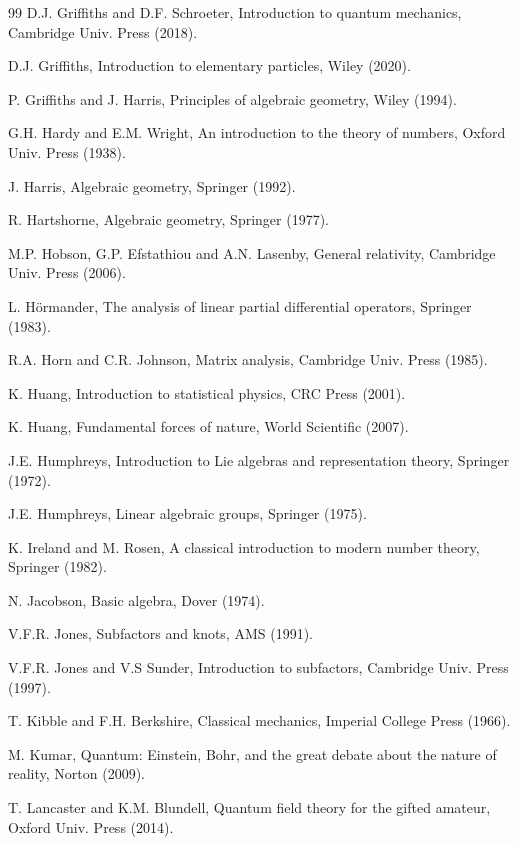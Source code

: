 \documentclass[12pt]{amsbook}
\begin{document}
\begin{thebibliography}{99}
D.J. Griffiths and D.F. Schroeter, Introduction to quantum mechanics, Cambridge Univ. Press (2018).

D.J. Griffiths, Introduction to elementary particles, Wiley (2020).

P. Griffiths and J. Harris, Principles of algebraic geometry, Wiley (1994).

G.H. Hardy and E.M. Wright, An introduction to the theory of numbers, Oxford Univ. Press (1938).

J. Harris, Algebraic geometry, Springer (1992).

R. Hartshorne, Algebraic geometry, Springer (1977).

M.P. Hobson, G.P. Efstathiou and A.N. Lasenby, General relativity, Cambridge Univ. Press (2006).

L. H\"ormander, The analysis of linear partial differential operators, Springer (1983).

R.A. Horn and C.R. Johnson, Matrix analysis, Cambridge Univ. Press (1985).

K. Huang, Introduction to statistical physics, CRC Press (2001).

K. Huang, Fundamental forces of nature, World Scientific (2007).

J.E. Humphreys, Introduction to Lie algebras and representation theory, Springer (1972).

J.E. Humphreys, Linear algebraic groups, Springer (1975). 

K. Ireland and M. Rosen, A classical introduction to modern number theory, Springer (1982).

N. Jacobson, Basic algebra, Dover (1974).

V.F.R. Jones, Subfactors and knots, AMS (1991).

V.F.R. Jones and V.S Sunder, Introduction to subfactors, Cambridge Univ. Press (1997).

T. Kibble and F.H. Berkshire, Classical mechanics, Imperial College Press (1966).

M. Kumar, Quantum: Einstein, Bohr, and the great debate about the nature of reality, Norton (2009). 

T. Lancaster and K.M. Blundell, Quantum field theory for the gifted amateur, Oxford Univ. Press (2014).


\end{thebibliography}
\end{document}
